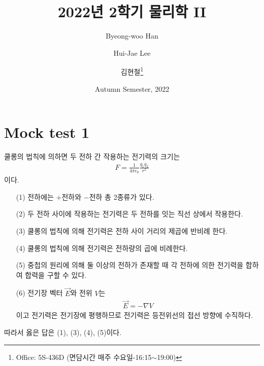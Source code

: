 \documentclass[tightenlines,floatfix,nofootinbib,superscriptaddress,fleqn]{revtex4}
\begin{document}
\title{\Large 2022년 2학기 물리학 II}
\author{Byeong-woo Han}
  \author{Hui-Jae Lee}
\author{김현철\footnote{Office: 5S-436D (면담시간 매주
    수요일-16:15$\sim$19:00)}} 
\date{Autumn Semester, 2022}

\maketitle

\section*{\large Mock test 1 }
 쿨롱의 법칙에 의하면 두 전하 간 작용하는 전기력의 크기는
\begin{align}
  F = \frac{1}{4\pi \epsilon_0}\frac{q_1q_2}{r^2}
\end{align}
이다.
\\

\begin{itemize}
  \item[(1)] 전하에는 $+$전하와 $-$전하 총 2종류가 있다.
  \item[(2)] 두 전하 사이에 작용하는 전기력은 두 전하를 잇는 직선 상에서 작용한다.
  \item[(3)] 쿨롱의 법칙에 의해 전기력은 전하 사이 거리의 제곱에 반비례 한다.
  \item[(4)] 쿨롱의 법칙에 의해 전기력은 전하량의 곱에 비례한다.
  \item[(5)] 중첩의 원리에 의해 둘 이상의 전하가 존재할 때 각 전하에 의한 전기력을 합하여
  합력을 구할 수 있다.
  \item[(6)] 전기장 벡터 $\vec{E}$와 전위 $V$는
  \begin{align}
    \vec{E} = -\nabla V
  \end{align}
  이고 전기력은 전기장에 평행하므로 전기력은 등전위선의 접선 방향에 수직하다.
\end{itemize}
따라서 옳은 답은 (1), (3), (4), (5)이다.  \\
\end{document}
